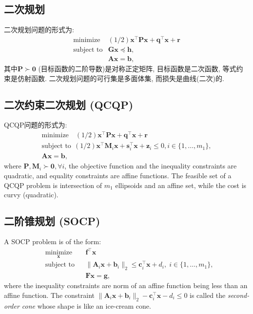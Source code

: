 \documentclass[lang=cn,10pt]{gorgeousnbook}
\numberwithin{equation}{section}%
\numberwithin{figure}{section}%
\begin{document}
\subsection{二次规划}
二次规划问题的形式为: 
\begin{equation}
\begin{array}{ll}\text{minimize}&(1/2)\boldsymbol{x}^\top \boldsymbol{Px}+\boldsymbol{q}^\top \boldsymbol{x}+\boldsymbol{r}\\\text{subject to}&\boldsymbol{Gx}\preceq \boldsymbol{h},\\&\boldsymbol{Ax}=\boldsymbol{b},\end{array}
\end{equation}
其中$\boldsymbol{P}\succ \mathbf{0}$ (目标函数的二阶导数)是对称正定矩阵, 目标函数是二次函数, 等式约束是仿射函数. 二次规划问题的可行集是多面体集, 而损失是曲线(二次)的.

\subsection{二次约束二次规划 (QCQP)}
QCQP问题的形式为:
\begin{equation}
\begin{gathered}
  \mathrm{minimize}\quad(1/2)\boldsymbol{x}^{\top}\boldsymbol{Px}+\boldsymbol{q}^{\top}\boldsymbol{x}+\boldsymbol{r} \\
  \text{subject to}~~(1/2)\boldsymbol{x}^{\top}\boldsymbol{M}_{i}\boldsymbol{x}+\boldsymbol{s}_{i}^{\top}\boldsymbol{x}+\boldsymbol{z}_{i}\leq0,i\in\{1,\ldots,m_{1}\}, \\
  \boldsymbol{Ax}=\boldsymbol{b}, 
\end{gathered}
\end{equation}
where $\boldsymbol{P}, \boldsymbol{M}_i \succ \boldsymbol{0}, \forall i$, the objective function and the inequality constraints are quadratic, and equality constraints are affine functions. 
The feasible set of a QCQP problem is intersection of $m_1$ ellipsoids and an affine set, while the cost is curvy (quadratic).

\subsection{二阶锥规划 (SOCP)}

A SOCP problem is of the form:
\begin{equation}
\begin{aligned}
& \underset{\boldsymbol{x}}{\text{minimize}}
& & \boldsymbol{f}^\top \boldsymbol{x} \\
& \text{subject to}
& & \|\boldsymbol{A}_i \boldsymbol{x} + \boldsymbol{b}_i\|_2 \leq \boldsymbol{c}_i^\top \boldsymbol{x} + d_i, \; i \in \{1, \ldots, m_1\}, \\
& & & \boldsymbol{Fx} = \boldsymbol{g},
\end{aligned}
\end{equation}
where the inequality constraints are norm of an affine function being less than an affine function. The constraint $\|\boldsymbol{A}_i \boldsymbol{x} + \boldsymbol{b}_i\|_2 - \boldsymbol{c}_i^\top \boldsymbol{x} - d_i \leq 0$ is called the \textit{second-order cone} whose shape is like an ice-cream cone. 
\end{document}
